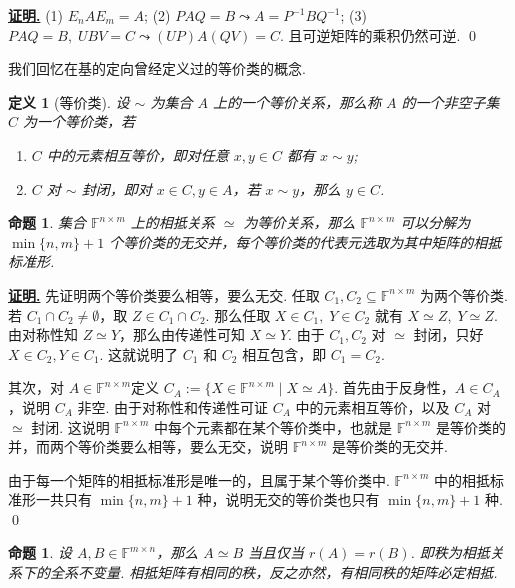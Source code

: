\documentclass[10pt,openany]{article}
\theoremstyle{thmstyle} %
\theoremstyle{defstyle} %
\newtheorem{definition}[theorem]{定义}
\theoremstyle{prostyle} %
\newtheorem{proposition}[theorem]{命题}
\theoremstyle{exastyle}
\theoremstyle{remstyle}
\renewenvironment{proof}[1][证明]{\par\underline{\textbf{#1.}} \;\fangsong}{\qed\par}
\newcommand{\F}{\mathbb{F}}
\newcommand{\mn}{^{m \times n}}
\newcommand{\nm}{^{n \times m}}
\begin{document}
\begin{proof}
	(1) \( E_nAE_m=A \); (2) \( PAQ=B \leadsto A=P^{-1}BQ^{-1} \); (3) \( PAQ=B, \; UBV=C \leadsto (UP)A(QV)=C \). 且可逆矩阵的乘积仍然可逆.
\end{proof}

我们回忆在基的定向曾经定义过的等价类的概念.

\begin{definition}[等价类]
	设 \( \sim \) 为集合 \( A \) 上的一个等价关系，那么称 \( A \) 的一个非空子集 \( C \) 为一个等价类，若
	\begin{enumerate}[(1)]
		\item \( C \) 中的元素相互等价，即对任意 \( x,y \in C \) 都有 \( x \sim y \);
		\item \( C \) 对 \( \sim \) 封闭，即对 \( x \in C, y \in A \)，若 \( x \sim y \)，那么 \( y \in C  \).
	\end{enumerate}
\end{definition}

\begin{proposition} \label{3.1.6}
	集合 \( \F\nm \) 上的相抵关系 \( \simeq \) 为等价关系，那么 \( \F\nm \) 可以分解为 \( \min\{n,m\}+1 \) 个等价类的无交并，每个等价类的代表元选取为其中矩阵的相抵标准形.
\end{proposition}

\begin{proof}
	先证明两个等价类要么相等，要么无交. 任取 \( C_1,C_2 \subseteq  \F\nm  \) 为两个等价类. 若 \( C_1 \cap C_2 \neq \emptyset \)，取 \( Z \in C_1 \cap C_2 \). 那么任取 \( X \in C_1, \; Y \in C_2 \) 就有 \( X \simeq Z, \; Y \simeq Z \). 由对称性知 \( Z \simeq Y \)，那么由传递性可知 \( X \simeq Y \). 由于 \( C_1, C_2 \) 对 \( \simeq \) 封闭，只好 \( X \in C_2, Y \in C_1 \). 这就说明了 \( C_1 \) 和 \( C_2 \) 相互包含，即 \( C_1=C_2 \).
	
	其次，对 \( A \in \F\nm \)定义 \( C_A:=\{X \in \F\nm \mid X \simeq A \} \). 首先由于反身性，\( A \in C_A \)，说明 \( C_A \) 非空. 由于对称性和传递性可证 \( C_A \) 中的元素相互等价，以及 \( C_A \) 对 \( \simeq \) 封闭. 这说明 \( \F\nm \) 中每个元素都在某个等价类中，也就是 \( \F\nm \) 是等价类的并，而两个等价类要么相等，要么无交，说明  \( \F\nm \) 是等价类的无交并.
	
	由于每一个矩阵的相抵标准形是唯一的，且属于某个等价类中. \( \F\nm \) 中的相抵标准形一共只有  \( \min\{n,m\}+1 \) 种，说明无交的等价类也只有   \( \min\{n,m\}+1 \) 种.
\end{proof}

\begin{proposition} 
	设 \( A,B \in \F\mn \)，那么 \( A \simeq B \) 当且仅当 \( r(A)=r(B) \). 即秩为相抵关系下的全系不变量. 相抵矩阵有相同的秩，反之亦然，有相同秩的矩阵必定相抵.
\end{proposition}
\end{document}
